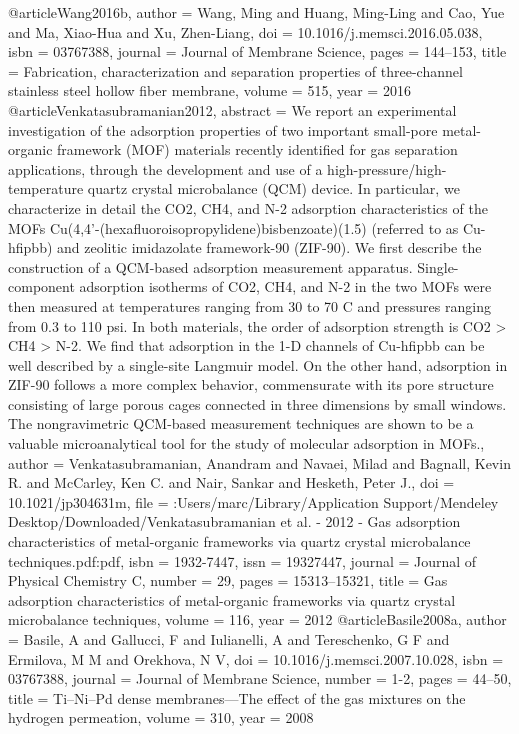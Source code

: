 @article{Wang2016b,
author = {Wang, Ming and Huang, Ming-Ling and Cao, Yue and Ma, Xiao-Hua and Xu, Zhen-Liang},
doi = {10.1016/j.memsci.2016.05.038},
isbn = {03767388},
journal = {Journal of Membrane Science},
pages = {144--153},
title = {{Fabrication, characterization and separation properties of three-channel stainless steel hollow fiber membrane}},
volume = {515},
year = {2016}
}
@article{Venkatasubramanian2012,
abstract = {We report an experimental investigation of the adsorption properties of two important small-pore metal-organic framework (MOF) materials recently identified for gas separation applications, through the development and use of a high-pressure/high-temperature quartz crystal microbalance (QCM) device. In particular, we characterize in detail the CO2, CH4, and N-2 adsorption characteristics of the MOFs Cu(4,4'-(hexafluoroisopropylidene)bisbenzoate)(1.5) (referred to as Cu-hfipbb) and zeolitic imidazolate framework-90 (ZIF-90). We first describe the construction of a QCM-based adsorption measurement apparatus. Single-component adsorption isotherms of CO2, CH4, and N-2 in the two MOFs were then measured at temperatures ranging from 30 to 70 C and pressures ranging from 0.3 to 110 psi. In both materials, the order of adsorption strength is CO2 {\textgreater} CH4 {\textgreater} N-2. We find that adsorption in the 1-D channels of Cu-hfipbb can be well described by a single-site Langmuir model. On the other hand, adsorption in ZIF-90 follows a more complex behavior, commensurate with its pore structure consisting of large porous cages connected in three dimensions by small windows. The nongravimetric QCM-based measurement techniques are shown to be a valuable microanalytical tool for the study of molecular adsorption in MOFs.},
author = {Venkatasubramanian, Anandram and Navaei, Milad and Bagnall, Kevin R. and McCarley, Ken C. and Nair, Sankar and Hesketh, Peter J.},
doi = {10.1021/jp304631m},
file = {:Users/marc/Library/Application Support/Mendeley Desktop/Downloaded/Venkatasubramanian et al. - 2012 - Gas adsorption characteristics of metal-organic frameworks via quartz crystal microbalance techniques.pdf:pdf},
isbn = {1932-7447},
issn = {19327447},
journal = {Journal of Physical Chemistry C},
number = {29},
pages = {15313--15321},
title = {{Gas adsorption characteristics of metal-organic frameworks via quartz crystal microbalance techniques}},
volume = {116},
year = {2012}
}
@article{Basile2008a,
author = {Basile, A and Gallucci, F and Iulianelli, A and Tereschenko, G F and Ermilova, M M and Orekhova, N V},
doi = {10.1016/j.memsci.2007.10.028},
isbn = {03767388},
journal = {Journal of Membrane Science},
number = {1-2},
pages = {44--50},
title = {{Ti–Ni–Pd dense membranes—The effect of the gas mixtures on the hydrogen permeation}},
volume = {310},
year = {2008}
}
